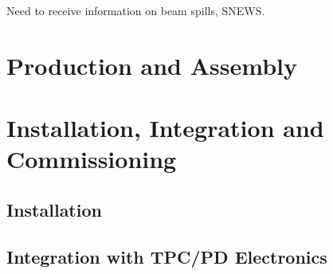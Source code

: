 Need to receive information on beam spills, SNEWS.

\section{Production and Assembly}
\label{sec:fdsp-daq-prod-assy}



%


%
%
%
%


\section{Installation, Integration and Commissioning}
\label{sec:fdsp-daq-install}

\subsection{Installation}
\label{sec:fdsp-daq-install-transport}


\subsection{Integration with TPC/PD Electronics}
\label{sec:fdsp-daq-install-transport}


